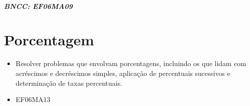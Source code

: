 {\paragraph{BNCC: EF06MA09 }


\chapter{Porcentagem}

\begin{itemize}
\item Resolver problemas que envolvam porcentagens,
incluindo os que lidam com acréscimos e decréscimos simples, aplicação
de percentuais sucessivos e determinação de taxas percentuais.
\end{itemize}

\begin{itemize}
\item EF06MA13
\end{itemize}

}
